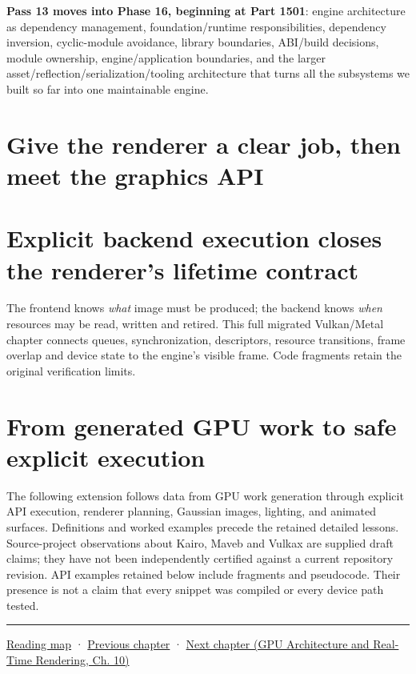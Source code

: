 \textbf{Pass 13 moves into Phase 16, beginning at Part 1501}: engine architecture as dependency management, foundation/runtime responsibilities, dependency inversion, cyclic-module avoidance, library boundaries, ABI/build decisions, module ownership, engine/application boundaries, and the larger asset/reflection/serialization/tooling architecture that turns all the subsystems we built so far into one maintainable engine.

\section{Give the renderer a clear job, then meet the graphics API}\label{05-engine-i-ch018-give-the-renderer-a-clear-job-then-meet-the-graphics-api}

\section{Explicit backend execution closes the renderer's lifetime contract}\label{05-engine-i-ch018-explicit-backend-execution-closes-the-renderers-lifetime-contract}

The frontend knows \emph{what} image must be produced; the backend knows \emph{when} resources may be read, written and retired. This full migrated Vulkan/Metal chapter connects queues, synchronization, descriptors, resource transitions, frame overlap and device state to the engine's visible frame. Code fragments retain the original verification limits.

\section{From generated GPU work to safe explicit execution}\label{05-engine-i-ch018-from-generated-gpu-work-to-safe-explicit-execution}

The following extension follows data from GPU work generation through explicit API execution, renderer planning, Gaussian images, lighting, and animated surfaces. Definitions and worked examples precede the retained detailed lessons. Source-project observations about Kairo, Maveb and Vulkax are supplied draft claims; they have not been independently certified against a current repository revision. API examples retained below include fragments and pseudocode. Their presence is not a claim that every snippet was compiled or every device path tested.

\begin{center}\rule{0.5\linewidth}{0.5pt}\end{center}

\hyperref[volume-reading-map]{Reading map} · \hyperref[05-engine-i-ch017-ecs-performance-through-cache-and-scheduling]{Previous chapter} · \href{../06-GPU-Architecture-and-Real-Time-Rendering/main.pdf\#nameddest=05-engine-i-ch019-gpu-work-and-reusable-metal-frames}{Next chapter (GPU Architecture and Real-Time Rendering, Ch. 10)}
